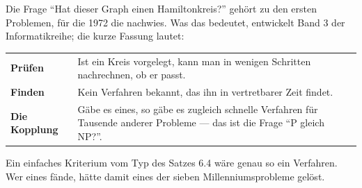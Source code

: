 \begin{forschung}
Die Frage \enquote{Hat dieser Graph einen Hamiltonkreis?} gehört zu den ersten Problemen, für die  1972 die  nachwies. Was das bedeutet, entwickelt Band 3 der Informatikreihe; die kurze Fassung lautet:

\begin{center}
\renewcommand{\arraystretch}{1.5}
\begin{tabular}{@{}P{3.0cm}P{5.6cm}@{}}
\toprule
\textbf{Prüfen} & Ist ein Kreis vorgelegt, kann man in wenigen Schritten nachrechnen, ob er passt.\\
\textbf{Finden} & Kein Verfahren bekannt, das ihn in vertretbarer Zeit findet.\\
\textbf{Die Kopplung} & Gäbe es eines, so gäbe es zugleich schnelle Verfahren für Tausende anderer Probleme --- das ist die Frage \enquote{P gleich NP?}.\\
\bottomrule
\end{tabular}
\end{center}

Ein einfaches Kriterium vom Typ des Satzes 6.4 wäre genau so ein Verfahren. Wer eines fände, hätte damit eines der sieben Millenniumsprobleme gelöst.

\begin{center}
\begin{minipage}{0.88\textwidth}
\end{minipage}
\end{center}
\end{forschung}

